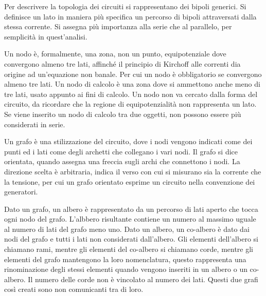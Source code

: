 \documentclass{article}
\numberwithin{equation}{subsection}
\begin{document}
Per descrivere la topologia dei circuiti si rappresentano dei bipoli generici. Si definisce un lato in maniera più specifica un percorso di bipoli attraversati dalla 
stessa corrente. Si assegna più importanza alla serie che al parallelo, per semplicità in quest'analisi. 

Un nodo è, formalmente, una zona, non un punto, equipotenziale dove convergono almeno tre lati, affinché il principio di Kirchoff alle correnti dia origine ad un'equazione 
non banale. Per cui un nodo è obbligatorio se convergono almeno tre lati. Un nodo di calcolo è una zona dove si ammettono anche meno di tre lati, usato appunto ai fini di 
calcolo. Un nodo non va cercato dalla forma del circuito, da ricordare che la regione di equipotenzialità non rappresenta un lato. Se viene inserito un nodo di calcolo tra due 
oggetti, non possono essere più considerati in serie. 



Un grafo è una stilizzazione del circuito, dove i nodi vengono indicati come dei punti ed i lati come degli archetti che collegano i vari nodi. Il grafo si dice orientata, 
quando assegna una freccia sugli archi che connettono i nodi. La direzione scelta è arbitraria, indica il verso con cui si misurano sia la corrente che la tensione, per cui 
un grafo orientato esprime un circuito nella convenzione dei generatori.  



Dato un grafo, un albero è rappresentato da un percorso di lati aperto che tocca ogni nodo del grafo. L'albbero risultante contiene un numero al massimo uguale al numero di lati 
del grafo meno uno. Dato un albero, un co-albero è dato dai nodi del grafo e tutti i lati non considerati dall'albero. Gli elementi dell'albero si chiamano rami, mentre gli 
elementi del co-albero si chiamano corde, mentre gli elementi del grafo mantengono la loro nomenclatura, questo rappresenta una rinominazione degli stessi elementi quando 
vengono inseriti in un albero o un co-albero. Il numero delle corde non è vincolato al numero dei lati. Questi due grafi così creati sono non comunicanti tra di loro. 
\end{document}
